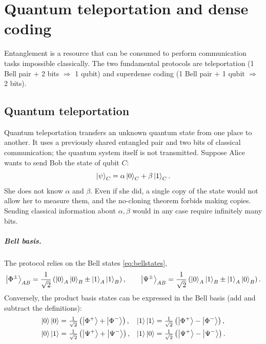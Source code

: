 \chapter{Quantum teleportation and dense coding}\label{ch:teleportation}

Entanglement is a resource that can be consumed to perform communication tasks impossible classically. The two fundamental protocols are teleportation
(1 Bell pair + 2 bits $\Rightarrow$ 1 qubit) and superdense coding (1 Bell pair + 1 qubit $\Rightarrow$ 2 bits).

\section{Quantum teleportation}
Quantum teleportation \cite{Bennett1993} transfers an unknown quantum state from one place to another. It uses a previously shared entangled pair and two bits of classical
communication; the quantum system itself is not transmitted. Suppose Alice wants to send Bob the state of qubit $C$:
\begin{equation}
  \left|\psi\right\rangle_C=\alpha\left|0\right\rangle_C+\beta\left|1\right\rangle_C.
\end{equation}
She does not know $\alpha$ and $\beta$. Even if she did, a single copy of the state would not allow her to measure them, and the no-cloning theorem forbids making copies.
Sending classical information about $\alpha,\beta$ would in any case require infinitely many bits.

\paragraph{Bell basis.} The protocol relies on the Bell states \cref{eq:bellstates},
\begin{equation}
  \left|\Phi^\pm\right\rangle_{AB}=\frac1{\sqrt2}\left(\left|0\right\rangle_A\left|0\right\rangle_B\pm\left|1\right\rangle_A\left|1\right\rangle_B\right),\qquad\left|\Psi^\pm\right\rangle_{AB}=\frac1{\sqrt2}\left(\left|0\right\rangle_A\left|1\right\rangle_B\pm\left|1\right\rangle_A\left|0\right\rangle_B\right).
\end{equation}
Conversely, the product basis states can be expressed in the Bell basis (add and subtract the definitions):
\begin{align}
  \left|0\right\rangle\left|0\right\rangle&=\tfrac1{\sqrt2}\left(\left|\Phi^+\right\rangle+\left|\Phi^-\right\rangle\right),&\left|1\right\rangle\left|1\right\rangle&=\tfrac1{\sqrt2}\left(\left|\Phi^+\right\rangle-\left|\Phi^-\right\rangle\right),\nonumber\\
  \left|0\right\rangle\left|1\right\rangle&=\tfrac1{\sqrt2}\left(\left|\Psi^+\right\rangle+\left|\Psi^-\right\rangle\right),&\left|1\right\rangle\left|0\right\rangle&=\tfrac1{\sqrt2}\left(\left|\Psi^+\right\rangle-\left|\Psi^-\right\rangle\right).\label{eq:prodtobell}
\end{align}

